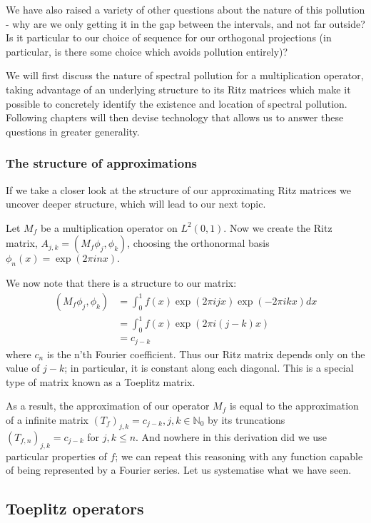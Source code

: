 \documentclass[../main.tex]{subfiles}
\begin{document}
We have also raised a variety of other questions about the nature of this pollution - why are we only getting it in the gap between the intervals, and not far outside? Is it particular to our choice of sequence for our orthogonal projections (in particular, is there some choice which avoids pollution entirely)?

We will first discuss the nature of spectral pollution for a multiplication operator, taking advantage of an underlying structure to its Ritz matrices which 
make it possible to concretely identify the existence and location of spectral pollution. Following chapters will then devise technology that allows us to 
answer these questions in greater generality.

\subsubsection{The structure of approximations}
If we take a closer look at the structure of our approximating Ritz matrices we uncover deeper structure, which will lead
to our next topic.
\begin{example}\label{exp:mult-op-toeplitz}
Let $M_f$ be a multiplication operator on $L^2(0, 1)$. Now we create the Ritz matrix, $A_{j,k} = (M_f \phi_j, \phi_k)$, 
choosing the orthonormal basis $\phi_n(x) = \exp(2 \pi i n x).$

We now note that there is a structure to our matrix:
\begin{align*}
(M_f \phi_j, \phi_k) & = \int_0^1 f(x) \exp(2 \pi i j x) \exp(-2 \pi i k x) dx \\
& = \int_0^1 f(x) \exp(2 \pi i (j-k) x)\\
& = c_{j-k}
\end{align*}
where $c_n$ is the n'th Fourier coefficient. Thus our Ritz matrix depends only on the value of $j-k$; in particular, it is constant
along each diagonal. This is a special type of matrix known as a Toeplitz matrix.
\end{example}
As a result, the approximation of our operator $M_f$ is equal to the approximation of a infinite matrix $(T_f)_{j,k} = c_{j-k},
j,k \in \mathbb{N}_0$ by its truncations $(T_{f,n})_{j,k} = c_{j-k}$ for $j, k \leq n$. And nowhere in this derivation did we use particular
properties of $f$; we can repeat this reasoning with any function capable of being represented by a Fourier series. Let us systematise
what we have seen.

\subsection{Toeplitz operators}\label{sec:toeplitz}
\end{document}
